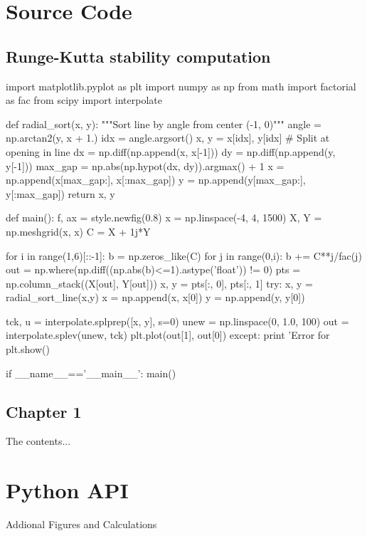 \chapter{Source Code}

\section{Runge-Kutta stability computation}
\begin{python}
import matplotlib.pyplot as plt
import numpy as np
from math import factorial as fac
from scipy import interpolate

def radial_sort(x, y):
    """Sort line by angle from center (-1, 0)"""
    angle = np.arctan2(y, x + 1.)
    idx = angle.argsort()
    x, y = x[idx], y[idx]
    # Split at opening in line
    dx = np.diff(np.append(x, x[-1]))
    dy = np.diff(np.append(y, y[-1]))
    max_gap = np.abs(np.hypot(dx, dy)).argmax() + 1
    x = np.append(x[max_gap:], x[:max_gap])
    y = np.append(y[max_gap:], y[:max_gap])
    return x, y

def main():
    f, ax = style.newfig(0.8)
    x = np.linspace(-4, 4, 1500)
    X, Y = np.meshgrid(x, x)
    C = X + 1j*Y

    for i in range(1,6)[::-1]:
        b = np.zeros_like(C)
        for j in range(0,i):
            b += C**j/fac(j)
        out = np.where(np.diff((np.abs(b)<=1).astype('float')) != 0)
        pts = np.column_stack((X[out], Y[out]))
        x, y = pts[:, 0], pts[:, 1]
        try:
            x, y = radial_sort_line(x,y)
            x = np.append(x, x[0])
            y = np.append(y, y[0])

            tck, u = interpolate.splprep([x, y], s=0)
            unew = np.linspace(0, 1.0, 100)
            out = interpolate.splev(unew, tck)
            plt.plot(out[1], out[0])
        except:
            print 'Error for %
    plt.show()

if __name__=='__main__':
    main()

\end{python}
\clearpage

\section{Chapter 1}
The contents...
\chapter{Python API}
Addional Figures and Calculations
